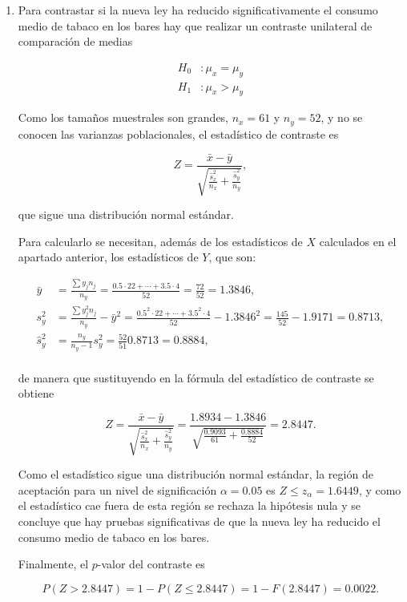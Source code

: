 \documentclass[
  spanish,
  a4paper,
]{scrreport}
\theoremstyle{definition}
\theoremstyle{remark}
\begin{document}
\begin{tcolorbox}
\begin{enumerate}
  \[
  n = \frac{4 z_{\alpha/2}^2 \hat s^2}{A^2} = \frac{4\cdot 2.5758^2 \cdot 0.9093}{(2\cdot 0.1)^2} = 603.2974,
  \]

  es decir, se necesitarían como mínimo \(603\) individuos.
\item
  Para contrastar si la nueva ley ha reducido significativamente el
  consumo medio de tabaco en los bares hay que realizar un contraste
  unilateral de comparación de medias

  \begin{align*}
  H_0 &: \mu_x = \mu_y\\
  H_1 &: \mu_x > \mu_y
  \end{align*}

  Como los tamaños muestrales son grandes, \(n_x=61\) y \(n_y=52\), y no
  se conocen las varianzas poblacionales, el estadístico de contraste es

  \[
  Z = \frac{\bar x -\bar y}{\sqrt{\frac{\hat s_x^2}{n_x}+\frac{\hat s_y^2}{n_y}}},
  \]

  que sigue una distribución normal estándar.

  Para calcularlo se necesitan, además de los estadísticos de \(X\)
  calculados en el apartado anterior, los estadísticos de \(Y\), que
  son:

  \begin{align*}
  \bar y &= \frac{\sum y_jn_j}{n_y} = \frac{0.5\cdot22+\cdots+3.5\cdot4}{52} = \frac{72}{52} = 1.3846,\\
  s_y^2 & = \frac{\sum y_j^2n_j}{n_y}-\bar y^2 = \frac{0.5^2\cdot22+\cdots+3.5^2\cdot4}{52} -1.3846^2= \frac{145}{52}-1.9171 = 0.8713,\\
  \hat s_y^2 &= \frac{n_y}{n_y-1}s_y^2 = \frac{52}{51}0.8713 = 0.8884,\\
  \end{align*}

  de manera que sustituyendo en la fórmula del estadístico de contraste
  se obtiene

  \[
  Z = \frac{\bar x -\bar y}{\sqrt{\frac{\hat s_x^2}{n_x}+\frac{\hat s_y^2}{n_y}}} 
  = \frac{1.8934-1.3846}{\sqrt{\frac{0.9093}{61}+\frac{0.8884}{52}}} = 2.8447.
  \]

  Como el estadístico sigue una distribución normal estándar, la región
  de aceptación para un nivel de significación \(\alpha=0.05\) es
  \(Z\leq z_\alpha=1.6449\), y como el estadístico cae fuera de esta
  región se rechaza la hipótesis nula y se concluye que hay pruebas
  significativas de que la nueva ley ha reducido el consumo medio de
  tabaco en los bares.

  Finalmente, el \(p\)-valor del contraste es

  \[
  P(Z>2.8447)= 1- P(Z\leq 2.8447) = 1 - F(2.8447) = 0.0022.
  \]
\end{enumerate}

\end{tcolorbox}
\end{document}
